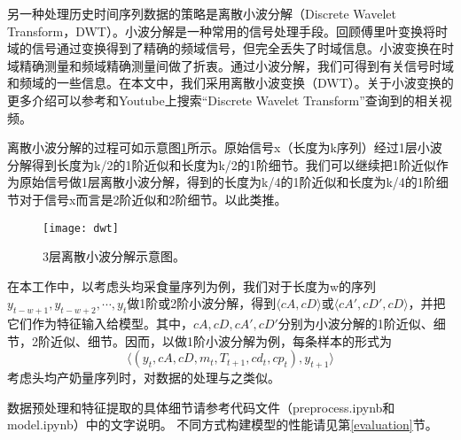 另一种处理历史时间序列数据的策略是离散小波分解（Discrete Wavelet Transform，DWT）。小波分解是一种常用的信号处理手段。回顾傅里叶变换将时域的信号通过变换得到了精确的频域信号，但完全丢失了时域信息。小波变换在时域精确测量和频域精确测量间做了折衷。通过小波分解，我们可得到有关信号时域和频域的一些信息。在本文中，我们采用离散小波变换（DWT）。关于小波变换的更多介绍可以参考\cite{vidakovic1994wavelets, valens1999really}和Youtube上搜索“Discrete Wavelet Transform”查询到的相关视频。

离散小波分解的过程可如示意图\ref{dwt}所示。原始信号x（长度为k序列）经过1层小波分解得到长度为k/2的1阶近似和长度为k/2的1阶细节。我们可以继续把1阶近似作为原始信号做1层离散小波分解，得到的长度为k/4的1阶近似和长度为k/4的1阶细节对于信号x而言是2阶近似和2阶细节。以此类推。

\begin{figure}
\begin{center}
	\texttt{[image: dwt]}
\caption{3层离散小波分解示意图。}
\label{dwt}
\end{center}
\end{figure}

在本工作中，以考虑头均采食量序列为例，我们对于长度为w的序列${y_{t-w+1}, y_{t-w+2}, \cdots, y_t}$做1阶或2阶小波分解，得到$\langle cA, cD\rangle$或$\langle cA', cD', cD\rangle$，并把它们作为特征输入给模型。其中，$cA, cD, cA', cD'$分别为小波分解的1阶近似、细节，2阶近似、细节。因而，以做1阶小波分解为例，每条样本的形式为
\begin{equation}
	\langle (y_t, cA, cD, m_t, T_{t+1}, cd_{t}, cp_{t}), y_{t+1} \rangle
\end{equation}
考虑头均产奶量序列时，对数据的处理与之类似。



数据预处理和特征提取的具体细节请参考代码文件（preprocess.ipynb和model.ipynb）中的文字说明。
不同方式构建模型的性能请见第\ref{evaluation}节。







